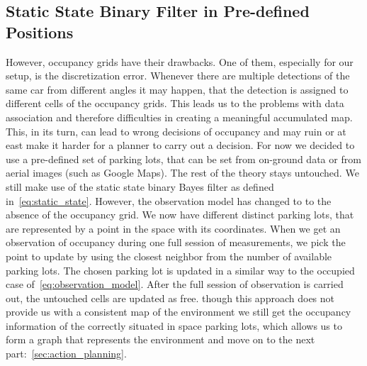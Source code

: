     \subsection{Static State Binary Filter in Pre-defined Positions}\label{sub:static_state_binary_filter_in_pre_defined_positions}
        However, occupancy grids have their drawbacks. One of them, especially for our setup, is the discretization error. Whenever there are multiple detections of the same car from different angles it may happen, that the detection is assigned to different cells of the occupancy grids. This leads us to the problems with data association and therefore difficulties in creating a meaningful accumulated map. This, in its turn, can lead to wrong decisions of occupancy and may ruin or at east make it harder for a planner to carry out a decision.
        For now we decided to use a pre-defined set of parking lots, that can be set from on-ground data or from aerial images (such as Google Maps). The rest of the theory stays untouched. We still make use of the static state binary Bayes filter as defined in~\ref{eq:static_state}. However, the observation model has changed to to the absence of the occupancy grid. We now have different distinct parking lots, that are represented by a point in the space with its coordinates. When we get an observation of occupancy during one full session of measurements, we pick the point to update by using the closest neighbor from the number of available parking lots. The chosen parking lot is updated in a similar way to the occupied case of~\ref{eq:observation_model}. After the full session of observation is carried out, the untouched cells are updated as free.
        though this approach does not provide us with a consistent map of the environment we still get the occupancy information of the correctly situated in space parking lots, which allows us to form a graph that represents the environment and move on to the next part:~\ref{sec:action_planning}.

